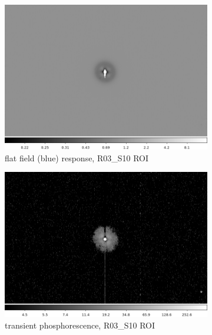 \begin{figure}[!htbp]
\centering
\begin{subfigure}{0.45\textwidth}
    \includegraphics[width=\textwidth]{figures/phosphorescence-survey/vamp_comp_R03_S10_flatresp.png}
     \caption{flat field (blue) response, R03\_S10 ROI}
     \label{subfig:flatresp_R03_S10}
\end{subfigure}
\begin{subfigure}{0.45\textwidth}
    \includegraphics[width=\textwidth]{figures/phosphorescence-survey/vamp_comp_R03_S10_phosresp.png}
     \caption{transient phosphorescence, R03\_S10 ROI}
     \label{subfig:phosresp_R03_S10}
\end{subfigure}
\newline
\begin{subfigure}{0.45\textwidth}

\end{subfigure}
\end{figure}
